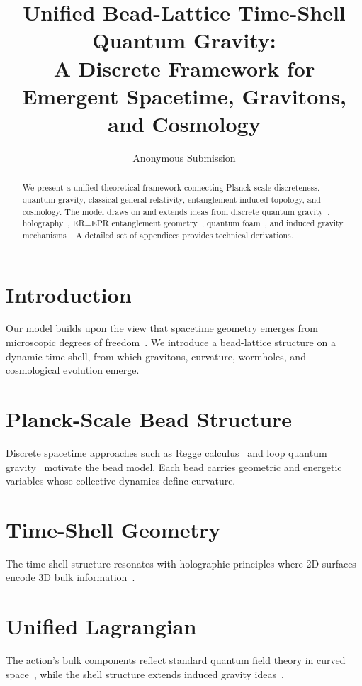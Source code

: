 \documentclass[12pt]{article}
\title{Unified Bead-Lattice Time-Shell Quantum Gravity:\\
A Discrete Framework for Emergent Spacetime, Gravitons, and Cosmology}
\author{Anonymous Submission}
\date{}
\begin{document}
\maketitle

\begin{abstract}
We present a unified theoretical framework connecting Planck-scale discreteness,
quantum gravity, classical general relativity, entanglement-induced topology,
and cosmology. The model draws on and extends ideas from discrete quantum 
gravity~\cite{Regge1961}, holography~\cite{Susskind1995}, ER=EPR 
entanglement geometry~\cite{Maldacena2013}, quantum foam~\cite{Wheeler1957}, 
and induced gravity mechanisms~\cite{Sakharov1967}. A detailed set of 
appendices provides technical derivations.
\end{abstract}

\section{Introduction}
Our model builds upon the view that spacetime geometry emerges from 
microscopic degrees of freedom~\cite{Jacobson1995, Verlinde2011}. 
We introduce a bead-lattice structure on a dynamic time shell, from which 
gravitons, curvature, wormholes, and cosmological evolution emerge.

\section{Planck-Scale Bead Structure}
Discrete spacetime approaches such as Regge calculus~\cite{Regge1961} 
and loop quantum gravity~\cite{Rovelli1998} motivate the bead model. 
Each bead carries geometric and energetic variables whose collective dynamics
define curvature.

\section{Time-Shell Geometry}
The time-shell structure resonates with holographic principles where 
2D surfaces encode 3D bulk information~\cite{Susskind1995, Bousso2002}.

\section{Unified Lagrangian}
The action's bulk components reflect standard quantum field 
theory in curved space~\cite{BirrellDavies}, while the shell structure 
extends induced gravity ideas~\cite{Sakharov1967}.
\end{document}
